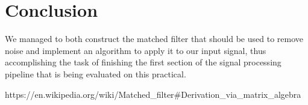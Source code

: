 \documentclass[conference,9pt]{IEEEtran}
\begin{document}
\section{Conclusion}
We managed to both construct the matched filter that should be used to remove noise and implement an algorithm to apply it to our input signal, thus accomplishing the task of finishing the first section of the signal processing pipeline that is being evaluated on this practical.

\begin{thebibliography}{1}
https://en.wikipedia.org/wiki/Matched\_filter\#Derivation\_via\_matrix\_algebra
\end{thebibliography}

\end{document}

